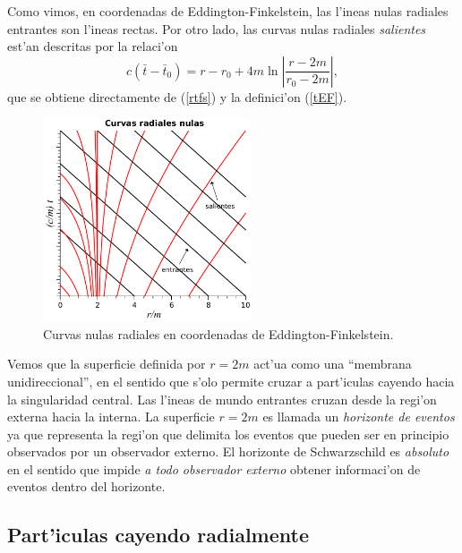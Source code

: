 Como vimos, en coordenadas de Eddington-Finkelstein, las l'ineas nulas radiales entrantes son l'ineas rectas. Por otro lado, las curvas nulas radiales \textit{salientes} est'an descritas por la relaci'on
\begin{equation}
 c(\bar{t}-\bar{t}_0)=r-r_0+4m\ln\left|\frac{r-2m}{r_0-2m}\right|,  \label{rtfsEF}
\end{equation}
que se obtiene directamente de (\ref{rtfs}) y la definici'on (\ref{tEF}).

\begin{figure}[H]
 \begin{center}
\includegraphics[height=6cm]{fig/fig-nullrays-cEF-2.pdf}
\caption{Curvas nulas radiales en coordenadas de Eddington-Finkelstein.}
\label{fig:nullrays-cEF}
\end{center}
\end{figure}

Vemos que la superficie definida por $r=2m$ act'ua como una ``membrana unidireccional'', en el sentido que s'olo permite cruzar a part'iculas cayendo hacia la singularidad central. Las l'ineas de mundo entrantes cruzan desde la regi'on externa hacia la interna. La superficie $r=2m$ es llamada un \textit{horizonte de eventos} ya que representa la regi'on que delimita los eventos que pueden ser en principio observados por un observador externo. El horizonte de Schwarzschild es \textit{absoluto} en el sentido que impide \textit{a todo observador externo} obtener informaci'on de eventos dentro del horizonte.

\subsection{Part'iculas cayendo radialmente}

